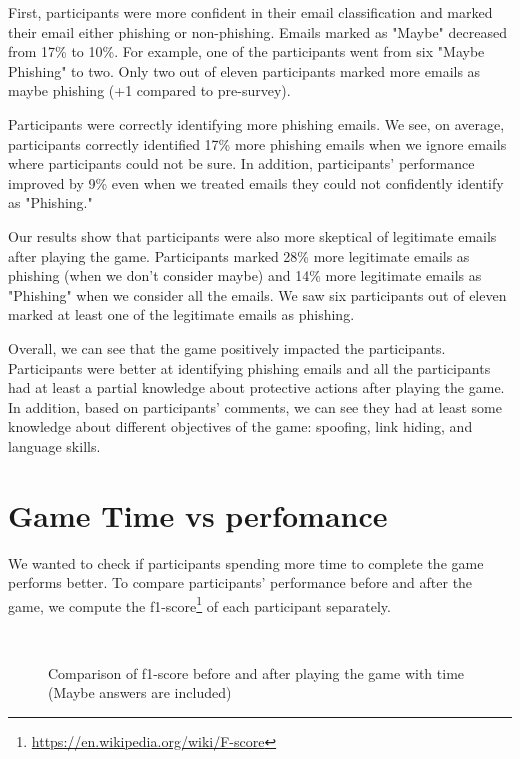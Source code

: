First, participants were more confident in their email classification and marked their email either phishing or non-phishing. Emails marked as "Maybe" decreased from 17\% to 10\%. For example, one of the participants went from six "Maybe Phishing" to two. Only two out of eleven participants marked more emails as maybe phishing (+1 compared to pre-survey).

Participants were correctly identifying more phishing emails. We see, on average, participants correctly identified 17\% more phishing emails when we ignore emails where participants could not be sure. In addition, participants' performance improved by 9\% even when we treated emails they could not confidently identify as "Phishing."

Our results show that participants were also more skeptical of legitimate emails after playing the game. Participants marked 28\% more legitimate emails as phishing (when we don't consider maybe) and 14\% more legitimate emails as "Phishing" when we consider all the emails. We saw six participants out of eleven marked at least one of the legitimate emails as phishing.

Overall, we can see that the game positively impacted the participants. Participants were better at identifying phishing emails and all the participants had at least a partial knowledge about protective actions after playing the game. In addition, based on participants' comments, we can see they had at least some knowledge about different objectives of the game: spoofing, link hiding, and language skills.

\section{Game Time vs perfomance}
We wanted to check if participants spending more time to complete the game performs better. To compare participants' performance before and after the game, we compute the f1-score\footnote{\url{https://en.wikipedia.org/wiki/F-score}} of each participant separately.

\begin{figure}[!ht]
    \begin{center}

         \\
        \hfill
        \hfill
        \caption{Comparison of f1-score before and after playing the game with time (Maybe answers are included)}
        \label{fig:f1_with_time}
    \end{center}

\end{figure}


